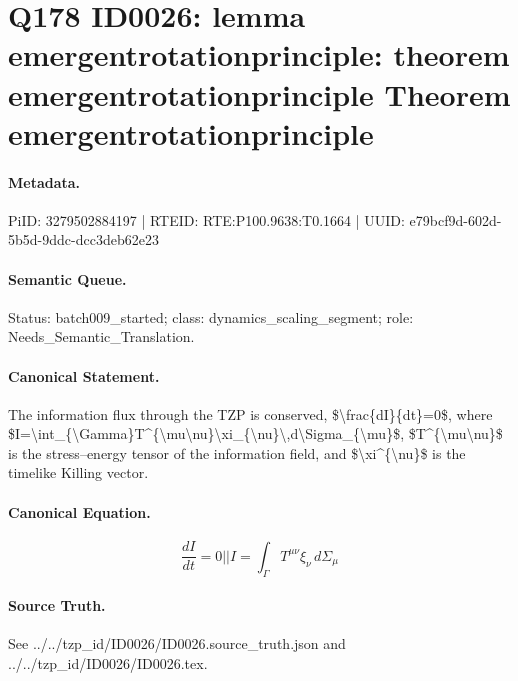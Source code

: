 \section*{Q178 ID0026: lemma emergentrotationprinciple: theorem emergentrotationprinciple Theorem emergentrotationprinciple}
\paragraph{Metadata.}
PiID: 3279502884197 | RTEID: RTE:P100.9638:T0.1664 | UUID: e79bcf9d-602d-5b5d-9ddc-dcc3deb62e23

\paragraph{Semantic Queue.}
Status: batch009\_started; class: dynamics\_scaling\_segment; role: Needs\_Semantic\_Translation.

\paragraph{Canonical Statement.}
The information flux through the TZP is conserved, \$\textbackslash{}frac\{dI\}\{dt\}=0\$, where \$I=\textbackslash{}int\_\{\textbackslash{}Gamma\}T\textasciicircum{}\{\textbackslash{}mu\textbackslash{}nu\}\textbackslash{}xi\_\{\textbackslash{}nu\}\textbackslash{},d\textbackslash{}Sigma\_\{\textbackslash{}mu\}\$, \$T\textasciicircum{}\{\textbackslash{}mu\textbackslash{}nu\}\$ is the stress--energy tensor of the information field, and \$\textbackslash{}xi\textasciicircum{}\{\textbackslash{}nu\}\$ is the timelike Killing vector.

\paragraph{Canonical Equation.}
\[
\frac{dI}{dt}=0 || I = \int_{\Gamma} T^{\mu\nu}\xi_{\nu}\, d\Sigma_{\mu}
\]

\paragraph{Source Truth.}
See ../../tzp\_id/ID0026/ID0026.source\_truth.json and ../../tzp\_id/ID0026/ID0026.tex.

